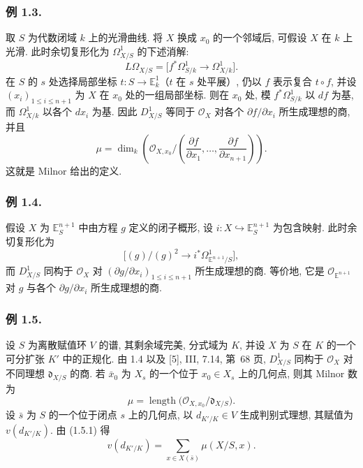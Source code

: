 \subsubsection*{例 1.3.}
取 $S$ 为代数闭域 $k$ 上的光滑曲线. 将 $X$ 换成 $x_0$ 的一个邻域后, 可假设 $X$ 在 $k$ 上光滑. 此时余切复形化为 $\Omega^1_{X/S}$ 的下述消解:
\[
L\Omega_{X/S}
=\bigl[f^*\Omega^1_{S/k}\longrightarrow\Omega^1_{X/k}\bigr].
\]
在 $S$ 的 $s$ 处选择局部坐标 $t:S\to\mathbb E^1_k$（$t$ 在 $s$ 处平展）, 仍以 $f$ 表示复合 $t\circ f$, 并设 $(x_i)_{1\le i\le n+1}$ 为 $X$ 在 $x_0$ 处的一组局部坐标. 则在 $x_0$ 处, 模 $f^*\Omega^1_{S/k}$ 以 $df$ 为基, 而 $\Omega^1_{X/k}$ 以各个 $dx_i$ 为基. 因此 $D^1_{X/S}$ 等同于 $\mathcal O_X$ 对各个 $\partial f/\partial x_i$ 所生成理想的商, 并且
\begin{equation}\tag{1.3.1}
\mu=\dim_k\!\left(
\mathcal O_{X,x_0}/
\left(\frac{\partial f}{\partial x_1},\ldots,
      \frac{\partial f}{\partial x_{n+1}}\right)\right).
\end{equation}
这就是 Milnor 给出的定义.

\subsubsection*{例 1.4.}
假设 $X$ 为 $\mathbb E^{n+1}_S$ 中由方程 $g$ 定义的闭子概形, 设 $i:X\hookrightarrow\mathbb E^{n+1}_S$ 为包含映射. 此时余切复形化为
\[
\bigl[(g)/(g)^2\longrightarrow
i^*\Omega^1_{\mathbb E^{n+1}/S}\bigr],
\]
而 $D^1_{X/S}$ 同构于 $\mathcal O_X$ 对 $(\partial g/\partial x_i)_{1\le i\le n+1}$ 所生成理想的商. 等价地, 它是 $\mathcal O_{\mathbb E^{n+1}}$ 对 $g$ 与各个 $\partial g/\partial x_i$ 所生成理想的商.

\subsubsection*{例 1.5.}
设 $S$ 为离散赋值环 $V$ 的谱, 其剩余域完美, 分式域为 $K$, 并设 $X$ 为 $S$ 在 $K$ 的一个可分扩张 $K'$ 中的正规化. 由 1.4 以及 [5], III, 7.14, 第~68 页, $D^1_{X/S}$ 同构于 $\mathcal O_X$ 对不同理想 $\mathfrak d_{X/S}$ 的商. 若 $\bar x_0$ 为 $X_s$ 的一个位于 $x_0\in X_s$ 上的几何点, 则其 Milnor 数为
\begin{equation}\tag{1.5.1}
\mu=\operatorname{length}
\bigl(\mathcal O_{X,x_0}/\mathfrak d_{X/S}\bigr).
\end{equation}
设 $\bar s$ 为 $S$ 的一个位于闭点 $s$ 上的几何点, 以 $d_{K'/K}\in V$ 生成判别式理想, 其赋值为 $v(d_{K'/K})$. 由 (1.5.1) 得
\begin{equation}\tag{1.5.2}
v(d_{K'/K})=\sum_{x\in X(\bar s)}\mu(X/S,x).
\end{equation}
